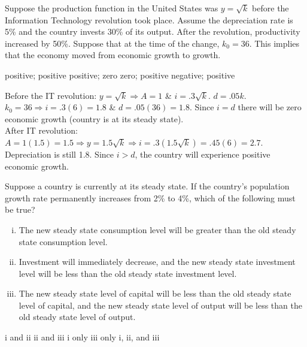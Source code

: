 \documentclass[addpoints,11pt]{exam}
\theoremstyle{definition}
\newcommand{\blank}[0]{\underline{\hspace{3cm}}}
\begin{document}
\begin{questions}
	
	
	\question Suppose the production function in the United States was $y = \sqrt{k}$ before the Information Technology revolution took place. Assume the depreciation rate is 5\% and the country invests 30\% of its output. After the revolution, productivity increased by 50\%. Suppose that at the time of the change, $k_0 = 36$. This implies that the economy moved from \blank economic growth to \blank growth. 
	
	\begin{choices}
		\choice positive; positive
		\choice positive; zero
		\CorrectChoice zero; positive
		\choice negative; positive
	\end{choices}
	
	\begin{solution}
		Before the IT revolution: $y = \sqrt{k} \Rightarrow A = 1$ \& $i = .3\sqrt{k}$. $d=.05k$. $k_0 = 36 \Rightarrow i = .3(6) = 1.8$ \& $d= .05(36) = 1.8$. Since $i=d$ there will be zero economic growth (country is at its steady state). \\
		After IT revolution: $A = 1(1.5) =1.5 \Rightarrow y=1.5\sqrt{k} \Rightarrow i = .3(1.5\sqrt{k}) = .45(6) = 2.7.$ Depreciation is still 1.8. Since $i>d$, the country will experience positive economic growth.
	\end{solution} 
	
\newpage
	
	\question Suppose a country is currently at its steady state. If the country's population growth rate permanently increases from 2\% to 4\%, which of the following must be true?
	
	
	\begin{enumerate}[i.]
		\item The new steady state consumption level will be greater than the old steady state consumption level.
		\item Investment will immediately decrease, and the new steady state investment level will be less than the old steady state investment level.
		\item The new steady state level of capital will be less than the old steady state level of capital, and the new steady state level of output will be less than the old steady state level of output.
	\end{enumerate}
	
	\begin{choices}
		\choice i and ii
		\choice ii and iii
		\choice i only
		\CorrectChoice iii only
		\choice i, ii, and iii
	\end{choices}
	

\end{questions}
\end{document}
